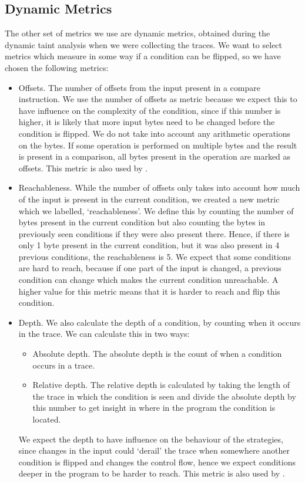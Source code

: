 \subsection{Dynamic Metrics}\label{subsec:designDynamicMetrics}
The other set of metrics we use are dynamic metrics, obtained during the dynamic taint analysis when we were collecting the traces. We want to select metrics which measure in some way if a condition can be flipped, so we have chosen the following metrics:
\begin{itemize}
    \item Offsets. The number of offsets from the input present in a compare instruction. We use the number of offsets as metric because we expect this to have influence on the complexity of the condition, since if this number is higher, it is likely that more input bytes need to be changed before the condition is flipped. We do not take into account any arithmetic operations on the bytes. If some operation is performed on multiple bytes and the result is present in a comparison, all bytes present in the operation are marked as offsets. This metric is also used by \cite{chen2018angora}.
    
    \item Reachableness. While the number of offsets only takes into account how much of the input is present in the current condition, we created a new metric which we labelled, `reachableness'.
    We define this by counting the number of bytes present in the current condition but also counting the bytes in previously seen conditions if they were also present there. Hence, if there is only 1 byte present in the current condition, but it was also present in 4 previous conditions, the reachableness is 5. We expect that some conditions are hard to reach, because if one part of the input is changed, a previous condition can change which makes the current condition unreachable. A higher value for this metric means that it is harder to reach and flip this condition.
    
    \item Depth. We also calculate the depth of a condition, by counting when it occurs in the trace. We can calculate this in two ways:
    \begin{itemize}
        \item Absolute depth. The absolute depth is the count of when a condition occurs in a trace. 
        \item Relative depth. The relative depth is calculated by taking the length of the trace in which the condition is seen and divide the absolute depth by this number to get insight in where in the program the condition is located.
    \end{itemize}
    We expect the depth to have influence on the behaviour of the strategies, since changes in the input could `derail' the trace when somewhere another condition is flipped and changes the control flow, hence we expect conditions deeper in the program to be harder to reach. This metric is also used by \cite{chen2020meuzz}.

\end{itemize}



